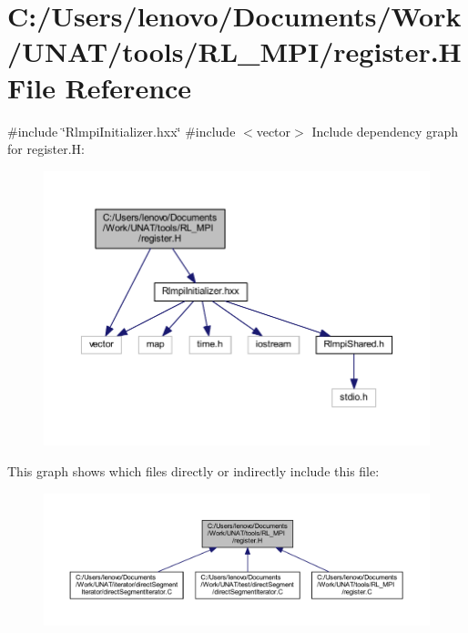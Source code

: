 \hypertarget{tools_2RL__MPI_2register_8H}{}\section{C\+:/\+Users/lenovo/\+Documents/\+Work/\+U\+N\+A\+T/tools/\+R\+L\+\_\+\+M\+P\+I/register.H File Reference}
\label{tools_2RL__MPI_2register_8H}
{\ttfamily \#include \char`\"{}Rlmpi\+Initializer.\+hxx\char`\"{}}\newline
{\ttfamily \#include $<$vector$>$}\newline
Include dependency graph for register.\+H\+:
\nopagebreak
\begin{figure}[H]
\begin{center}
\leavevmode
\includegraphics[width=350pt]{tools_2RL__MPI_2register_8H__incl}
\end{center}
\end{figure}
This graph shows which files directly or indirectly include this file\+:
\nopagebreak
\begin{figure}[H]
\begin{center}
\leavevmode
\includegraphics[width=350pt]{tools_2RL__MPI_2register_8H__dep__incl}
\end{center}
\end{figure}
